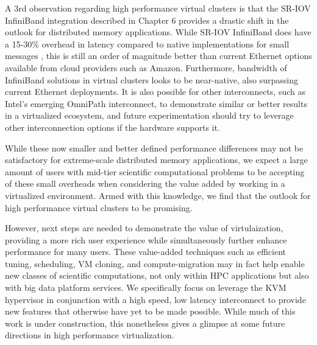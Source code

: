 A 3rd observation regarding high performance virtual clusters is that the SR-IOV InfiniBand integration described in Chapter 6 provides a drastic shift in the outlook for distributed memory applications.  While SR-IOV InfiniBand does have a 15-30\% overhead in latency compared to native implementations for small messages \cite{Musleh2014cloud}, this is still an order of magnitude better than current Ethernet options available from cloud providers such as Amazon. Furthermore, bandwidth of InfiniBand solutions in virtual clusters looks to be near-native, also surpassing current Ethernet deployments.  It is also possible for other interconnects, such as Intel's emerging OmniPath interconnect, to demonstrate similar or better results in a virtualized ecosystem, and future experimentation should try to leverage other interconnection options if the hardware supports it.  

While these now smaller and better defined performance differences may not be satisfactory for extreme-scale distributed memory applications, we expect a large amount of users with mid-tier scientific computational problems to be accepting of these small overheads when considering the value added by working in a virtualized environment. Armed with this knowledge, we find that the outlook for high performance virtual clusters to be promising.  

However, next steps are needed to demonstrate the value of virtulaization, providing a more rich user experience while simultaneously further enhance performance for many users.  These value-added techniques such as efficient tuning, scheduling, VM cloning, and compute-migration may in fact help enable new classes of scientific computations, not only within HPC applications but also with big data platform services. We specifically focus on leverage the KVM hypervisor in conjunction with a high speed, low latency interconnect to provide new features that otherwise have yet to be made possible.  While much of this work is under construction, this nonetheless gives a glimpse at some future directions in high performance virtualization.     



